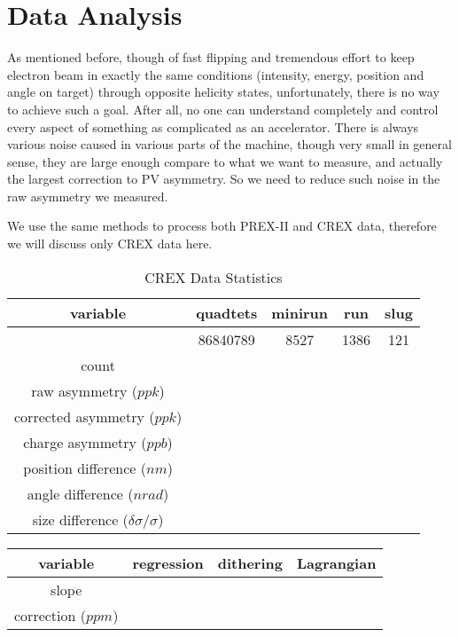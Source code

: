 \chapter{Data Analysis}
As mentioned before, though of fast flipping and tremendous effort to keep 
electron beam in exactly the same conditions (intensity, energy, position 
and angle on target) through opposite helicity states, unfortunately, 
there is no way to achieve such a goal. 
After all, no one can understand completely and control every aspect of
something as complicated as an accelerator. There is always various noise caused
in various parts of the machine, though very small in general sense, they are
large enough compare to what we want to measure, and actually the largest correction
to PV asymmetry. So we need to reduce such noise in the raw asymmetry we measured.

We use the same methods to process both PREX-II and CREX data, therefore we will
discuss only CREX data here.

\begin{table}
    \centering
    \begin{tabular}{c | c c c c }
	\hline
	variable    & quadtets    & minirun	& run	& slug	\\
	\hline	    & 86840789	& 8527	& 1386 & 121 \\
	count	    &	&   &	&   \\
	raw asymmetry ($ppk$)	&   \\
	corrected asymmetry ($ppk$)	&   \\
	\hline
	charge asymmetry ($ppb$)    \\
	position difference ($nm$)\\
	angle difference ($nrad$)	\\
	size difference ($\delta\sigma/\sigma$)	\\
	\hline
    \end{tabular}
    \caption{CREX Data Statistics}
\end{table}

\begin{table}
    \begin{tabular}{c | c c c}
	\hline
	variable    & regression    & dithering	    & Lagrangian    \\
	\hline
	slope	\\
	correction ($ppm$)  \\
	\hline
    \end{tabular}
\end{table}

\begin{comment}
    \begin{itemize}
	\item (design) PREX-II statistical width: $\sim 120\ ppm @30Hz$
	\item (design) BCM resolution: $40\ ppm$
	\item (measured) 1 MHz BCM electronics: $\sim 25\ ppm @30 Hz, 20\ \mu A$
	\item charge and position jitter
	    $$ A_Q: 100-300\ ppm \quad \Delta x: 5-25\ \mu m$$
    \end{itemize}
\end{comment}

